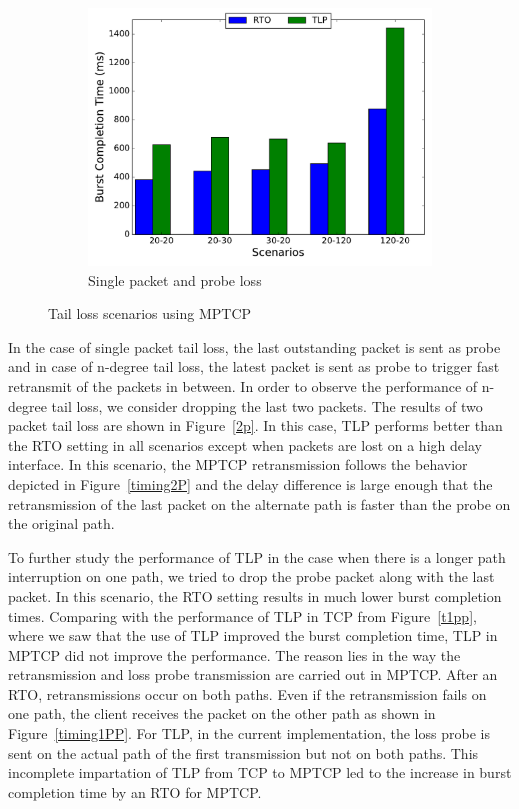 \documentclass[10pt,conference]{IEEEtran}
\begin{document}
\begin{figure}[!tbp]
\begin{subfigure}[b]{0.32\textwidth}
\includegraphics[angle=0, width=\textwidth, natwidth=578.16,natheight=433.62]{plots/1PP.pdf}
\caption{Single packet and probe loss}\label{1pp}
 \end{subfigure}
 \caption{Tail loss scenarios using MPTCP}
\end{figure}




In the case of single packet tail loss, the last outstanding packet is sent as probe and in case of n-degree tail loss, the latest packet is sent 
as probe to trigger fast retransmit of the packets in between. In order to observe the performance of n-degree tail loss, we consider dropping the 
last two packets. The results of two packet tail loss are shown in Figure~\ref{2p}. In this case, TLP performs better than the RTO 
setting in all scenarios except when packets are lost on a high delay interface. In this scenario, the MPTCP retransmission follows the 
behavior depicted in Figure~\ref{timing2P} and the delay difference is large enough that the retransmission of the last packet on the alternate 
path is faster than the probe on the original path. 


To further study the performance of TLP in the case when there is a longer path interruption on one path, we tried to drop the probe packet along 
with the last packet. In this scenario, the RTO setting results in much lower burst completion times. Comparing with the performance of TLP in 
TCP from Figure~\ref{t1pp}, where we saw that the use of TLP improved the burst completion time, TLP in MPTCP did not improve the performance. The 
reason lies in the way the retransmission and loss probe transmission are carried out in MPTCP. After an RTO, retransmissions occur on both 
paths. Even if the retransmission fails on one path, the client receives the packet on the other path as shown in Figure~\ref{timing1PP}. For TLP, 
in the current implementation, the loss probe is sent on the actual path of the first transmission but not on both paths. This incomplete impartation 
of TLP from TCP to MPTCP led to the increase in burst completion time by an RTO for MPTCP. 
\end{document}
